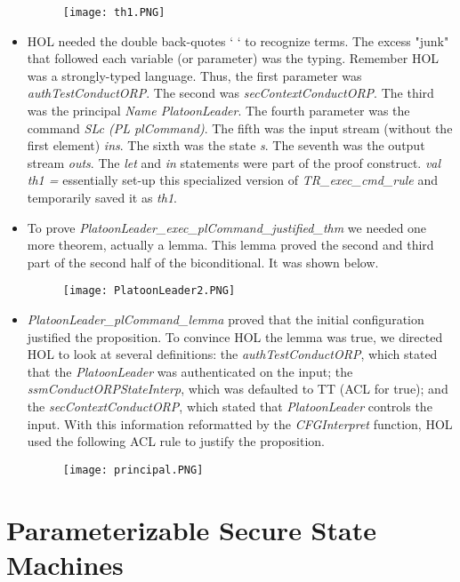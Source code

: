 \begin{itemize}
  \begin{figure}[h]
  \centering
  \texttt{[image: th1.PNG]}
\end{figure}
\item HOL needed the double back-quotes ` ` to recognize terms.  The excess "junk" that followed
  each variable (or parameter) was the typing.  Remember HOL was a strongly-typed language.  Thus,
  the first parameter was \textit{authTestConductORP}.  The second was \textit{secContextConductORP}.
  The third was the principal \textit{Name PlatoonLeader}.  The fourth parameter was the command
  \textit{SLc (PL plCommand)}.  The fifth was the input stream (without the first element)
  \textit{ins}.  The sixth was the state \textit{s}.  The seventh was the output stream
  \textit{outs}.  The \textit{let} and \textit{in} statements were part of the proof construct.
  \textit{val th1 =} essentially set-up this specialized version of \textit{TR_exec_cmd_rule} and
  temporarily saved it as \textit{th1}.
\item To prove \textit{PlatoonLeader_exec_plCommand_justified_thm} we needed one more theorem,
  actually a lemma.  This lemma proved the second and third part of the second half of the biconditional.
  It was shown below.
  \begin{figure}[h]
  \centering
  \texttt{[image: PlatoonLeader2.PNG]}
\end{figure}
\item \textit{PlatoonLeader_plCommand_lemma} proved that the initial configuration justified the
  proposition.  To convince HOL the lemma was true, we directed HOL to look at several definitions:
  the \textit{authTestConductORP}, which stated that the \textit{PlatoonLeader} was authenticated
  on the input; the \textit{ssmConductORPStateInterp}, which was defaulted to TT (ACL for true);
  and the \textit{secContextConductORP}, which stated that \textit{PlatoonLeader} controls the input.
  With this information reformatted by the \textit{CFGInterpret} function, HOL used the following
  ACL rule to justify the proposition.
  \begin{figure}[h]
  \centering
  \texttt{[image: principal.PNG]}
\end{figure}
\end{itemize}

\chapter{Parameterizable Secure State Machines}
\label{cha:param-secure-state}


